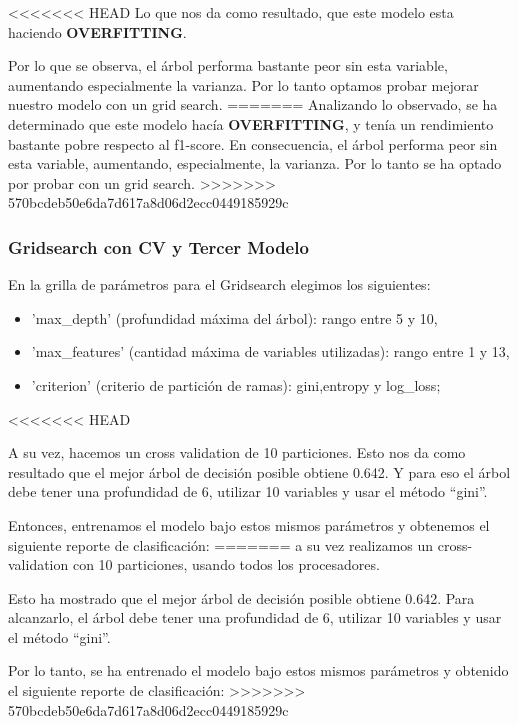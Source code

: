 \documentclass[a4paper]{article}
\begin{document}
<<<<<<< HEAD
            Lo que nos da como resultado, que este modelo esta haciendo \textbf{OVERFITTING}.

            Por lo que se observa, el árbol performa bastante peor sin esta variable, aumentando especialmente la varianza. Por lo tanto optamos probar mejorar nuestro modelo con un grid search.
=======
            Analizando lo observado, se ha determinado que este modelo hacía \textbf{OVERFITTING}, y tenía un rendimiento bastante pobre respecto al f1-score. En consecuencia, el árbol performa peor sin esta variable, aumentando, especialmente, la varianza. Por lo tanto se ha optado por probar con un grid search.
>>>>>>> 570bcdeb50e6da7d617a8d06d2ecc0449185929c
        
        \subsubsection{Gridsearch con CV y Tercer Modelo}
            
            En la grilla de parámetros para el Gridsearch elegimos los siguientes:
            \begin{itemize}
                \item 'max\_depth' (profundidad máxima del árbol): rango entre 5 y 10,
                \item 'max\_features' (cantidad máxima de variables utilizadas): rango entre 1 y 13,
                \item 'criterion' (criterio de partición de ramas): gini,entropy y log\_loss;
            \end{itemize}
<<<<<<< HEAD
            
            A su vez, hacemos un cross validation de 10 particiones. Esto nos da como resultado que el mejor árbol de decisión posible obtiene 0.642. Y para eso el árbol debe tener una profundidad de  6, utilizar  10  variables y usar el método ``gini''.

            Entonces, entrenamos el modelo bajo estos mismos parámetros y obtenemos el siguiente reporte de clasificación:
=======
            a su vez realizamos un cross-validation con 10 particiones, usando todos los procesadores.
            
            Esto ha mostrado que el mejor árbol de decisión posible obtiene 0.642. Para alcanzarlo, el árbol debe tener una profundidad de  6, utilizar  10  variables y usar el método ``gini''.

            Por lo tanto, se ha entrenado el modelo bajo estos mismos parámetros y obtenido el siguiente reporte de clasificación:
>>>>>>> 570bcdeb50e6da7d617a8d06d2ecc0449185929c
\end{document}

